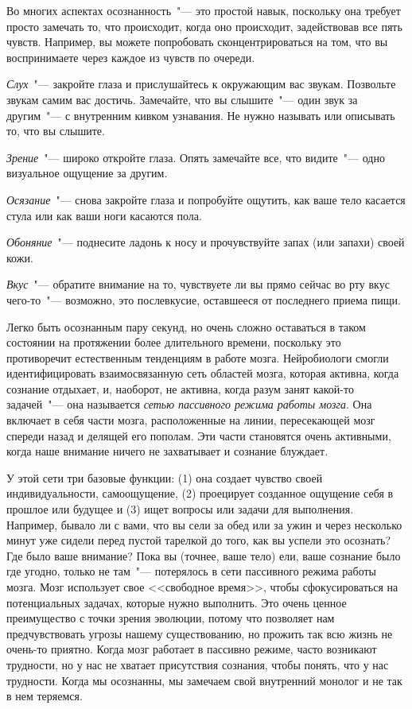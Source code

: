 Во многих аспектах осознанность~"--- это простой навык, поскольку она требует просто замечать то, что происходит, когда оно происходит, задействовав все пять чувств. Например, вы можете попробовать сконцентрироваться на том, что вы воспринимаете через каждое из чувств по очереди.

\begin{itemize}
	\itemdiamondsuit \textit{Слух}~"--- закройте глаза и прислушайтесь к окружающим вас звукам. Позвольте звукам самим вас достичь. Замечайте, что вы слышите~"--- один звук за другим~"--- с внутренним кивком узнавания. Не нужно называть или описывать то, что вы слышите.
	
	\itemdiamondsuit \textit{Зрение}~"--- широко откройте глаза. Опять замечайте все, что видите~"--- одно визуальное ощущение за другим.
	
	\itemdiamondsuit \textit{Осязание}~"--- снова закройте глаза и попробуйте ощутить, как ваше тело касается стула или как ваши ноги касаются пола.
	
	\itemdiamondsuit \textit{Обоняние}~"--- поднесите ладонь к носу и прочувствуйте запах (или запахи) своей кожи. 
	
	\itemdiamondsuit \textit{Вкус}~"--- обратите внимание на то, чувствуете ли вы прямо сейчас во рту вкус чего-то~"--- возможно, это послевкусие, оставшееся от последнего приема пищи. 
\end{itemize}

Легко быть осознанным пару секунд, но очень сложно оставаться в таком состоянии на протяжении более длительного времени, поскольку это противоречит естественным тенденциям в работе мозга. Нейробиологи смогли идентифицировать взаимосвязанную сеть областей мозга, которая активна, когда сознание отдыхает, и, наоборот, не активна, когда разум занят какой-то задачей~"--- она называется \emph{сетью пассивного режима работы мозга}. Она включает в себя части мозга, расположенные на линии, пересекающей мозг спереди назад и делящей его пополам. Эти части становятся очень активными, когда наше внимание ничего не захватывает и сознание блуждает. 

У этой сети три базовые функции: (1) она создает чувство своей индивидуальности, самоощущение, (2) проецирует созданное ощущение себя в прошлое или будущее и (3) ищет вопросы или задачи для выполнения. Например, бывало ли с вами, что вы сели за обед или за ужин и через несколько минут уже сидели перед пустой тарелкой до того, как вы успели это осознать? Где было ваше внимание? Пока вы (точнее, ваше тело) ели, ваше сознание было где угодно, только не там~"--- потерялось в сети пассивного режима работы мозга. Мозг использует свое <<свободное время>>, чтобы сфокусироваться на потенциальных задачах, которые нужно выполнить. Это очень ценное преимущество с точки зрения эволюции, потому что позволяет нам предчувствовать угрозы нашему существованию, но прожить так всю жизнь не очень-то приятно. Когда мозг работает в пассивно режиме, часто возникают трудности, но у нас не хватает присутствия сознания, чтобы понять, что у нас трудности. Когда мы осознанны, мы замечаем свой внутренний монолог и не так в нем теряемся. 

